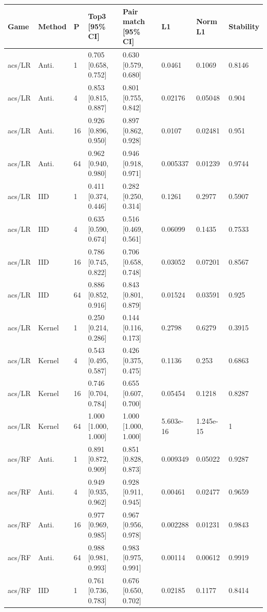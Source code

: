 \begingroup\footnotesize\setlength{\tabcolsep}{3pt}
\begin{tabular}{llllllll}
\toprule
Game & Method & P & Top3 [95\% CI] & Pair match [95\% CI] & L1 & Norm L1 & Stability \\
\midrule
acs/LR & Anti. & 1 & 0.705 [0.658, 0.752] & 0.630 [0.579, 0.680] & 0.0461 & 0.1069 & 0.8146 \\
acs/LR & Anti. & 4 & 0.853 [0.815, 0.887] & 0.801 [0.755, 0.842] & 0.02176 & 0.05048 & 0.904 \\
acs/LR & Anti. & 16 & 0.926 [0.896, 0.950] & 0.897 [0.862, 0.928] & 0.0107 & 0.02481 & 0.951 \\
acs/LR & Anti. & 64 & 0.962 [0.940, 0.980] & 0.946 [0.918, 0.971] & 0.005337 & 0.01239 & 0.9744 \\
acs/LR & IID & 1 & 0.411 [0.374, 0.446] & 0.282 [0.250, 0.314] & 0.1261 & 0.2977 & 0.5907 \\
acs/LR & IID & 4 & 0.635 [0.590, 0.674] & 0.516 [0.469, 0.561] & 0.06099 & 0.1435 & 0.7533 \\
acs/LR & IID & 16 & 0.786 [0.745, 0.822] & 0.706 [0.658, 0.748] & 0.03052 & 0.07201 & 0.8567 \\
acs/LR & IID & 64 & 0.886 [0.852, 0.916] & 0.843 [0.801, 0.879] & 0.01524 & 0.03591 & 0.925 \\
acs/LR & Kernel & 1 & 0.250 [0.214, 0.286] & 0.144 [0.116, 0.173] & 0.2798 & 0.6279 & 0.3915 \\
acs/LR & Kernel & 4 & 0.543 [0.495, 0.587] & 0.426 [0.375, 0.475] & 0.1136 & 0.253 & 0.6863 \\
acs/LR & Kernel & 16 & 0.746 [0.704, 0.784] & 0.655 [0.607, 0.700] & 0.05454 & 0.1218 & 0.8287 \\
acs/LR & Kernel & 64 & 1.000 [1.000, 1.000] & 1.000 [1.000, 1.000] & 5.603e-16 & 1.245e-15 & 1 \\
acs/RF & Anti. & 1 & 0.891 [0.872, 0.909] & 0.851 [0.828, 0.873] & 0.009349 & 0.05022 & 0.9287 \\
acs/RF & Anti. & 4 & 0.949 [0.935, 0.962] & 0.928 [0.911, 0.945] & 0.00461 & 0.02477 & 0.9659 \\
acs/RF & Anti. & 16 & 0.977 [0.969, 0.985] & 0.967 [0.956, 0.978] & 0.002288 & 0.01231 & 0.9843 \\
acs/RF & Anti. & 64 & 0.988 [0.981, 0.993] & 0.983 [0.975, 0.991] & 0.00114 & 0.00612 & 0.9919 \\
acs/RF & IID & 1 & 0.761 [0.736, 0.783] & 0.676 [0.650, 0.702] & 0.02185 & 0.1177 & 0.8414 \\

\end{tabular}
